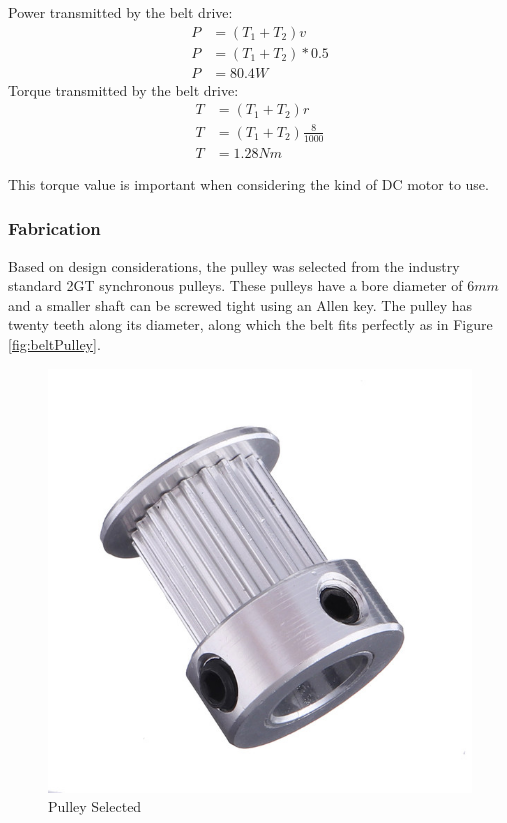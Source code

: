 Power transmitted by the belt drive:
\begin{equation}
    \begin{aligned}
        P &= (T_1 + T_2)v \\
        P &= (T_1 + T_2)*0.5\\
        P &= 80.4W
    \end{aligned}
\end{equation}
Torque transmitted by the belt drive:
\begin{equation}
    \begin{aligned}
        T &= (T_1 + T_2)r\\
        T &= (T_1 + T_2)\frac{8}{1000}\\
        T &= 1.28Nm
    \end{aligned}
\end{equation}

This torque value is important when considering the kind of \ac{DC} motor to use. 

\subsubsection{Fabrication}
Based on design considerations, the pulley was selected from the industry standard 2GT synchronous pulleys. These pulleys have a bore diameter of $6mm$ and a smaller shaft can be screwed tight using an Allen key. The pulley has twenty teeth along its diameter, along which the belt fits perfectly as in Figure \ref{fig:beltPulley}.

\begin{figure}[H]
    \centering
    \includegraphics[scale = 0.35]{Figures/2gtPulley.jpg}
    \caption{Pulley Selected}
    \label{fig:newPulley}
\end{figure}

